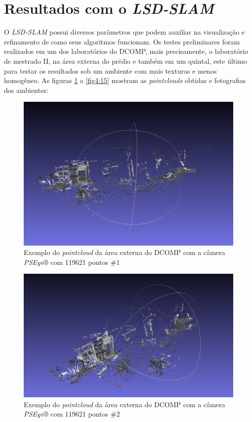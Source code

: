 \section{Resultados com o \textit{LSD-SLAM}}

O \textit{LSD-SLAM} possui diversos parâmetros que podem auxiliar na visualização e refinamento de como seus algoritmos funcionam. Os testes preliminares foram realizados em um dos laboratórios do DCOMP, mais precisamente, o laboratório de mestrado II, na área externa do prédio e também em um quintal, este último para testar os resultados sob um ambiente com mais texturas e menos homogêneo. As figuras \ref{fig4:5} a \ref{fig4:15} mostram as \textit{pointclouds} obtidas e fotografias dos ambientes:

\begin{figure}[H]
	\centering
		\includegraphics[width= \textwidth]{Imagens/figura4-5.jpg}
	\caption{Exemplo do \textit{pointcloud} da área externa do DCOMP com a câmera \textit{PSEye®} com 119621 pontos \#1}
	\label{fig4:5}
\end{figure}

\begin{figure}[H]
	\centering
		\includegraphics[width= \textwidth]{Imagens/figura4-6.jpg}
	\caption{Exemplo do \textit{pointcloud} da área externa do DCOMP com a câmera \textit{PSEye®} com 119621 pontos \#2}
	\label{fig4:6}
\end{figure}

